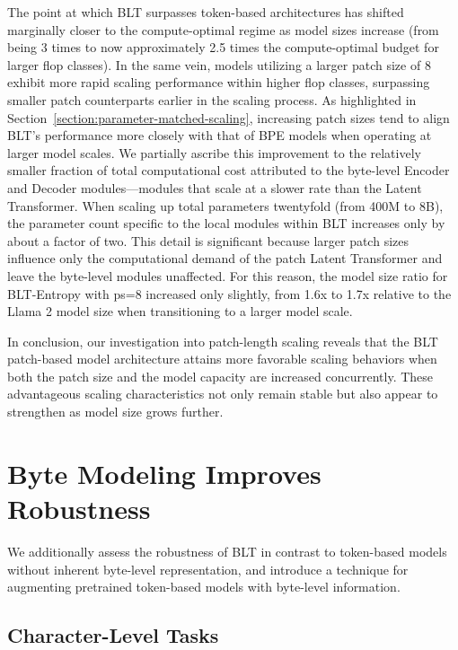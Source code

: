 The point at which {\textsc BLT} surpasses token-based architectures has shifted marginally closer to the compute-optimal regime as model sizes increase (from being 3 times to now approximately 2.5 times the compute-optimal budget for larger flop classes). In the same vein, models utilizing a larger patch size of 8 exhibit more rapid scaling performance within higher flop classes, surpassing smaller patch counterparts earlier in the scaling process. As highlighted in Section~\ref{section:parameter-matched-scaling}, increasing patch sizes tend to align {\textsc BLT}'s performance more closely with that of BPE models when operating at larger model scales. We partially ascribe this improvement to the relatively smaller fraction of total computational cost attributed to the byte-level Encoder and Decoder modules—modules that scale at a slower rate than the Latent Transformer. When scaling up total parameters twentyfold (from 400M to 8B), the parameter count specific to the local modules within {\textsc BLT} increases only by about a factor of two. This detail is significant because larger patch sizes influence only the computational demand of the patch Latent Transformer and leave the byte-level modules unaffected. For this reason, the model size ratio for {\textsc BLT}-Entropy with ps=8 increased only slightly, from 1.6x to 1.7x relative to the Llama 2 model size when transitioning to a larger model scale.

In conclusion, our investigation into patch-length scaling reveals that the {\textsc BLT} patch-based model architecture attains more favorable scaling behaviors when both the patch size and the model capacity are increased concurrently. These advantageous scaling characteristics not only remain stable but also appear to strengthen as model size grows further.

\section{Byte Modeling Improves Robustness} We additionally assess the robustness of {\textsc BLT} in contrast to token-based models without inherent byte-level representation, and introduce a technique for augmenting pretrained token-based models with byte-level information.  
\label{sec:robustness}

\subsection{Character-Level Tasks}

